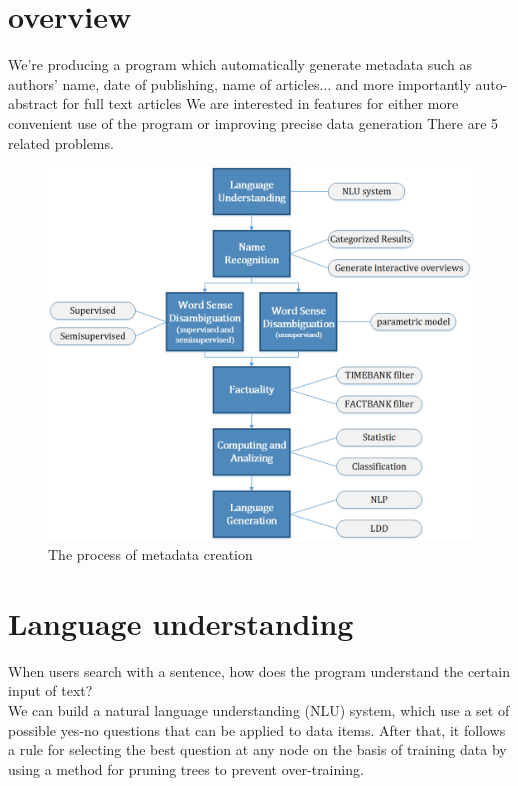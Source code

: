 \section*{overview}
\label{sec:prob}

We're producing a program which automatically generate metadata such as authors' name, date of publishing, name of articles... and more importantly auto-abstract for full text articles
We are interested in features for either more convenient use of the program or improving precise data generation
There are 5 related problems.\\
\begin{figure}
	\caption{The process of metadata creation}
\begin{center}
	\includegraphics[width=\columnwidth]{UnionChart}
\end{center}
\end{figure}

\section*{Language understanding}

When users search with a sentence, how does the program understand the certain input of text? \\

We can build a natural language understanding (NLU) system, which use a set of possible yes-no questions that can be applied to data items. After that, it follows a rule for selecting the best question at any node on the basis of training data by using a method for pruning trees to prevent over-training.


